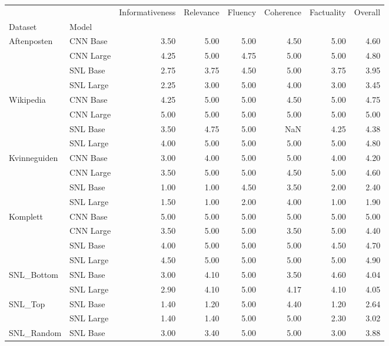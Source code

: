 \begin{tabular}{llrrrrrr}
\toprule
 &  & Informativeness & Relevance & Fluency & Coherence & Factuality & Overall \\
Dataset & Model &  &  &  &  &  &  \\
\midrule
\multirow[t]{4}{*}{Aftenposten} & CNN Base & 3.50 & 5.00 & 5.00 & 4.50 & 5.00 & 4.60 \\
 & CNN Large & 4.25 & 5.00 & 4.75 & 5.00 & 5.00 & 4.80 \\
 & SNL Base & 2.75 & 3.75 & 4.50 & 5.00 & 3.75 & 3.95 \\
 & SNL Large & 2.25 & 3.00 & 5.00 & 4.00 & 3.00 & 3.45 \\
\cline{1-8}
\multirow[t]{4}{*}{Wikipedia} & CNN Base & 4.25 & 5.00 & 5.00 & 4.50 & 5.00 & 4.75 \\
 & CNN Large & 5.00 & 5.00 & 5.00 & 5.00 & 5.00 & 5.00 \\
 & SNL Base & 3.50 & 4.75 & 5.00 & NaN & 4.25 & 4.38 \\
 & SNL Large & 4.00 & 5.00 & 5.00 & 5.00 & 5.00 & 4.80 \\
\cline{1-8}
\multirow[t]{4}{*}{Kvinneguiden} & CNN Base & 3.00 & 4.00 & 5.00 & 5.00 & 4.00 & 4.20 \\
 & CNN Large & 3.50 & 5.00 & 5.00 & 4.50 & 5.00 & 4.60 \\
 & SNL Base & 1.00 & 1.00 & 4.50 & 3.50 & 2.00 & 2.40 \\
 & SNL Large & 1.50 & 1.00 & 2.00 & 4.00 & 1.00 & 1.90 \\
\cline{1-8}
\multirow[t]{4}{*}{Komplett} & CNN Base & 5.00 & 5.00 & 5.00 & 5.00 & 5.00 & 5.00 \\
 & CNN Large & 3.50 & 5.00 & 5.00 & 3.50 & 5.00 & 4.40 \\
 & SNL Base & 4.00 & 5.00 & 5.00 & 5.00 & 4.50 & 4.70 \\
 & SNL Large & 4.50 & 5.00 & 5.00 & 5.00 & 5.00 & 4.90 \\
\cline{1-8}
\multirow[t]{2}{*}{SNL_Bottom} & SNL Base & 3.00 & 4.10 & 5.00 & 3.50 & 4.60 & 4.04 \\
 & SNL Large & 2.90 & 4.10 & 5.00 & 4.17 & 4.10 & 4.05 \\
\cline{1-8}
\multirow[t]{2}{*}{SNL_Top} & SNL Base & 1.40 & 1.20 & 5.00 & 4.40 & 1.20 & 2.64 \\
 & SNL Large & 1.40 & 1.40 & 5.00 & 5.00 & 2.30 & 3.02 \\
\cline{1-8}
\multirow[t]{2}{*}{SNL_Random} & SNL Base & 3.00 & 3.40 & 5.00 & 5.00 & 3.00 & 3.88 \\

\end{tabular}
